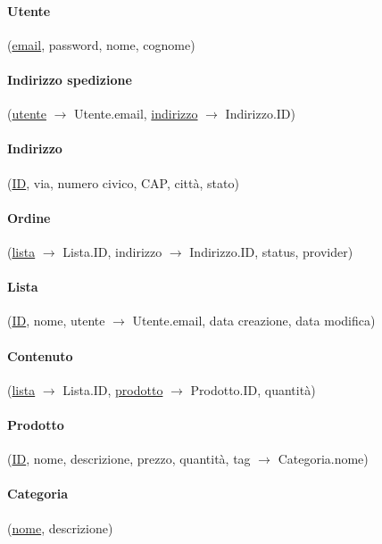 \documentclass[11pt]{article}
\begin{document}
\paragraph{Utente}(\underline{email}, password, nome, cognome)

\paragraph{Indirizzo spedizione}(\underline{utente} $\rightarrow$ Utente.email,
\underline{indirizzo} $\rightarrow$ Indirizzo.ID)

\paragraph{Indirizzo}(\underline{ID}, via, numero civico, CAP, città, stato)

\paragraph{Ordine}(\underline{lista} $\rightarrow$ Lista.ID, 
indirizzo $\rightarrow$ Indirizzo.ID, status, provider)

\paragraph{Lista}(\underline{ID}, nome, utente $\rightarrow$ Utente.email, data
creazione, data modifica)

\paragraph{Contenuto}(\underline{lista} $\rightarrow$ Lista.ID,
\underline{prodotto} $\rightarrow$ Prodotto.ID, quantità)

\paragraph{Prodotto}(\underline{ID}, nome, descrizione, prezzo, quantità, tag
$\rightarrow$ Categoria.nome)

\paragraph{Categoria}(\underline{nome}, descrizione)
\end{document}
